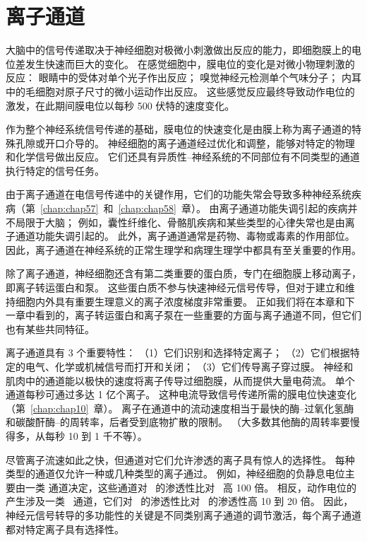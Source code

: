 \chapter{离子通道} \label{chap:chap8}

大脑中的信号传递取决于神经细胞对极微小刺激做出反应的能力，即细胞膜上的电位差发生快速而巨大的变化。
在感觉细胞中，膜电位的变化是对微小物理刺激的反应：
眼睛中的受体对单个光子作出反应；
嗅觉神经元检测单个气味分子；
内耳中的毛细胞对原子尺寸的微小运动作出反应。
这些感觉反应最终导致动作电位的激发，在此期间膜电位以每秒 500 伏特的速度变化。


作为整个神经系统信号传递的基础，膜电位的快速变化是由膜上称为离子通道的特殊孔隙或开口介导的。
神经细胞的离子通道经过优化和调整，能够对特定的物理和化学信号做出反应。
它们还具有异质性--神经系统的不同部位有不同类型的通道执行特定的信号任务。


由于离子通道在电信号传递中的关键作用，它们的功能失常会导致多种神经系统疾病（第~\ref{chap:chap57}~和~\ref{chap:chap58}~章）。
由离子通道功能失调引起的疾病并不局限于大脑；
例如，囊性纤维化、骨骼肌疾病和某些类型的心律失常也是由离子通道功能失调引起的。
此外，离子通道通常是药物、毒物或毒素的作用部位。
因此，离子通道在神经系统的正常生理学和病理生理学中都具有至关重要的作用。

除了离子通道，神经细胞还含有第二类重要的蛋白质，专门在细胞膜上移动离子，即离子转运蛋白和泵。
这些蛋白质不参与快速神经元信号传导，但对于建立和维持细胞内外具有重要生理意义的离子浓度梯度非常重要。
正如我们将在本章和下一章中看到的，离子转运蛋白和离子泵在一些重要的方面与离子通道不同，但它们也有某些共同特征。


离子通道具有 3 个重要特性：
（1）它们识别和选择特定离子；
（2）它们根据特定的电气、化学或机械信号而打开和关闭；
（3）它们传导离子穿过膜。
神经和肌肉中的通道能以极快的速度将离子传导过细胞膜，从而提供大量电荷流。
单个通道每秒可通过多达 1 亿个离子。
这种电流导致信号传递所需的膜电位快速变化（第~\ref{chap:chap10}~章）。
离子在通道中的流动速度相当于最快的酶--过氧化氢酶和碳酸酐酶--的周转率，后者受到底物扩散的限制。
（大多数其他酶的周转率要慢得多，从每秒 10 到 1 千不等）。


尽管离子流速如此之快，但通道对它们允许渗透的离子具有惊人的选择性。
每种类型的通道仅允许一种或几种类型的离子通过。
例如，神经细胞的负静息电位主要由一类  通道决定，这些通道对~ 的渗透性比对~ 高 100 倍。
相反，动作电位的产生涉及一类~ 通道，它们对~ 的渗透性比对~ 的渗透性高 10 到 20 倍。
因此，神经元信号转导的多功能性的关键是不同类别离子通道的调节激活，每个离子通道都对特定离子具有选择性。


